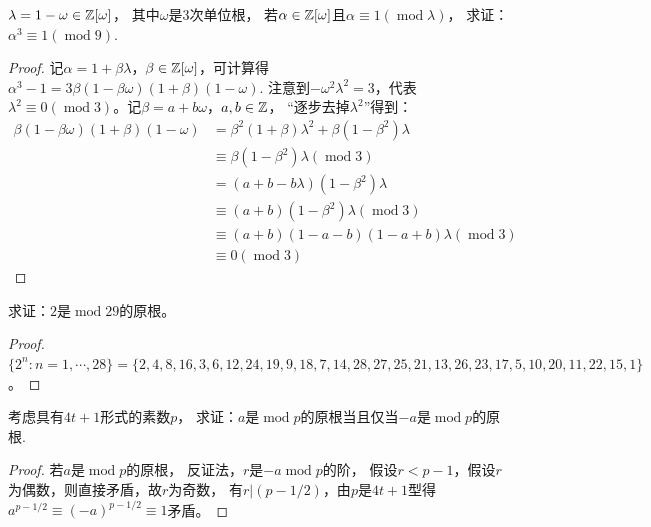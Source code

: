 \begin{exercise}
    $\lambda=1-\omega\in\mathbb{Z}[\omega]$，
    其中$\omega$是$3$次单位根，
    若$\alpha\in\mathbb{Z}[\omega]$且$\alpha\equiv1(\operatorname{mod}\lambda)$，
    求证：$\alpha^3\equiv1(\operatorname{mod}9)$.
\end{exercise}
\begin{proof}
    记$\alpha=1+\beta\lambda$，$\beta\in\mathbb{Z}[\omega]$，可计算得$\alpha^3-1=3\beta(1-\beta\omega)(1+\beta)(1-\omega)$.
    注意到$-\omega^2\lambda^2=3$，代表$\lambda^2\equiv0(\operatorname{mod}3)$。记$\beta=a+b\omega$，$a,b\in\mathbb{Z}$，
    ``逐步去掉$\lambda^2$''得到：
    \begin{align*}
        \beta(1-\beta\omega)(1+\beta)(1-\omega)
        &=\beta^2(1+\beta)\lambda^2+\beta(1-\beta^2)\lambda\\
        &\equiv\beta(1-\beta^2)\lambda(\operatorname{mod}3)\\
        &=(a+b-b\lambda)(1-\beta^2)\lambda\\
        &\equiv(a+b)(1-\beta^2)\lambda(\operatorname{mod}3)\\
        &\equiv(a+b)(1-a-b)(1-a+b)\lambda(\operatorname{mod}3)\\
        &\equiv0(\operatorname{mod}3)
    \end{align*}
\end{proof}

\begin{exercise}
    求证：$2$是$\operatorname{mod}29$的原根。
\end{exercise}
\begin{proof}
    $\{2^n:n=1,\cdots,28\}=\{2,4,8,16,3,6,12,24,19,9,18,7,14,28,27,25,21,13,26,23,17,5,10,20,11,22,15,1\}$。
\end{proof}

\begin{exercise}
    考虑具有$4t+1$形式的素数$p$，
    求证：$a$是$\operatorname{mod}p$的原根当且仅当$-a$是$\operatorname{mod}p$的原根.
\end{exercise}
\begin{proof}
    若$a$是$\operatorname{mod}p$的原根，
    反证法，$r$是$-a$$\operatorname{mod}p$的阶，
    假设$r<p-1$，假设$r$为偶数，则直接矛盾，故$r$为奇数，
    有$r|(p-1/2)$，由$p$是$4t+1$型得$a^{p-1/2}\equiv(-a)^{p-1/2}\equiv1$矛盾。
\end{proof}

